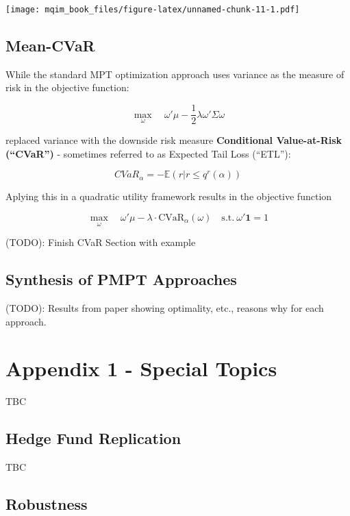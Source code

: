 \documentclass[]{book}
\theoremstyle{definition}
\theoremstyle{definition}
\theoremstyle{definition}
\theoremstyle{remark}
\begin{document}
\texttt{[image: mqim\_book\_files/figure-latex/unnamed-chunk-11-1.pdf]}

\section{Mean-CVaR}\label{mean-cvar}

While the standard MPT optimization approach uses variance as the
measure of risk in the objective function:

\[
\max_\omega \quad \omega' \mu - \frac{1}{2} \lambda \omega' \Sigma \omega
\]

\citep{rockafellar2000} replaced variance with the downside risk measure
\textbf{Conditional Value-at-Risk (``CVaR'')} - sometimes referred to as
Expected Tail Loss (``ETL''):

\[
CVaR_\alpha = - \mathbb{E} (r|r \leq q^r(\alpha))
\]

Aplying this in a quadratic utility framework results in the objective
function

\[
\max_\omega \quad \omega' \mu -  \lambda \cdot \text{CVaR}_\alpha (\omega) \quad \text{s.t.} \ \omega' \mathbf{1} = 1
\]

(TODO): Finish CVaR Section with example

\section{Synthesis of PMPT
Approaches}\label{synthesis-of-pmpt-approaches}

(TODO): Results from paper showing optimality, etc., reasons why for
each approach.

\chapter*{Appendix 1 - Special Topics}\label{appendix1}

TBC

\section*{Hedge Fund Replication}\label{hedge-fund-replication}

TBC

\section*{Robustness}\label{robustness}
\end{document}
